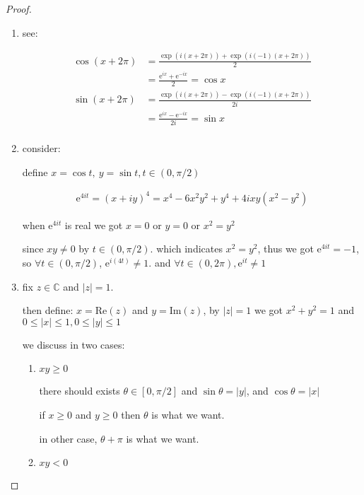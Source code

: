 \begin{proof}
    \begin{enumerate}
    \item see:
    
    \begin{align*}
        \cos(x+ 2\pi) &= \frac{\exp(i(x+2\pi)) + \exp(i(-1)(x+2\pi))}{2} \\
        &= \frac{\mathrm{e}^{ix} + \mathrm{e}^{-ix}}{2} = \cos x\\
        \sin(x+ 2\pi) &= \frac{\exp(i(x+2\pi)) - \exp(i(-1)(x+2\pi))}{2i} \\
        &= \frac{\mathrm{e}^{ix} - \mathrm{e}^{-ix}}{2i} = \sin x\\
    \end{align*}

    \item consider:

    define $x = \cos t,\: y = \sin t, t \in (0,\pi/ 2)$
    
    \begin{align}
        \mathrm{e}^{4it} = (x + iy)^4 = x^4 - 6x^2y^2 + y^4 + 4i xy(x^2 - y^2)
    \end{align}

    when $\mathrm{e}^{4it}$ is real we got $x = 0$ or $y = 0$ or $x^2 = y^2$

    since $xy \ne 0$ by $t \in (0,\pi/2)$. which indicates $x^2 = y^2$, thus we got
    $\mathrm{e}^{4it} = -1$, so $\forall t \in (0,\pi /2)$, $\mathrm{e}^{i(4t)} \ne 1$.
    and $\forall t \in (0,2\pi), \mathrm{e}^{it} \ne 1$

    \item fix $z \in \mathbb{C}$ and $|z| = 1$. 

    then define: $x = \mathrm{Re}(z)$ and $y = \mathrm{Im}(z)$, by $|z| = 1$ we got $x^2 + y^2 = 1$
    and $0 \le |x| \le 1, 0 \le |y| \le 1$


    we discuss in two cases:

    \begin{enumerate}
        \item $xy \ge 0$

        there should exists $\theta \in [0,\pi/2]$ and $\sin \theta = |y|$, and $\cos \theta = |x|$
        
        if $x \ge 0$ and $y \ge 0$ then $\theta$ is what we want.

        in other case, $\theta + \pi$ is what we want.

        \item $xy < 0$


\end{enumerate}
\end{enumerate}
\end{proof}
